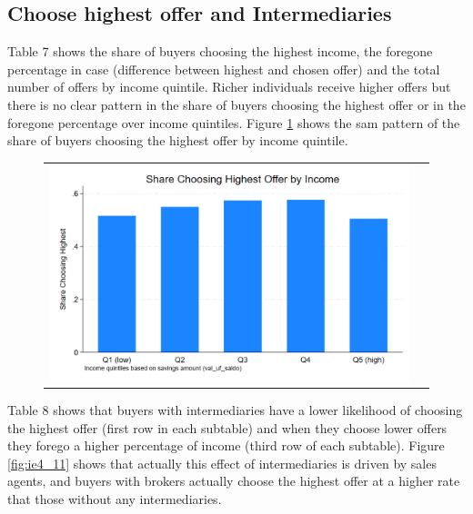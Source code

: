 \documentclass[12pt]{article}
\begin{document}
\newpage

\subsection{Choose highest offer and Intermediaries}

Table 7 shows the share of buyers choosing the highest income, the foregone percentage in case (difference between highest and chosen offer) and the total number of offers by income quintile. Richer individuals receive higher offers but there is no clear pattern in the share of buyers choosing the highest offer or in the foregone percentage over income quintiles. Figure \ref{fig:ie4_12} shows the sam pattern of the share of buyers choosing the highest offer by income quintile. 




  \begin{figure}[H]
\caption{}
 \label{fig:ie4_12}
\centering{}%
\begin{tabular}{cc}
\includegraphics[scale=0.27]{figures/IE4/IE4_highest_by_income.png} 
\end{tabular}
\end{figure} 

Table 8 shows that buyers with intermediaries have a lower likelihood of choosing the highest offer (first row in each subtable) and when they choose lower offers they forego a higher percentage of income (third row of each subtable).
Figure \ref{fig:ie4_11} shows that actually this effect of intermediaries is driven by sales agents, and buyers with brokers actually choose the highest offer at a higher rate that those without any intermediaries. 


\end{document}

